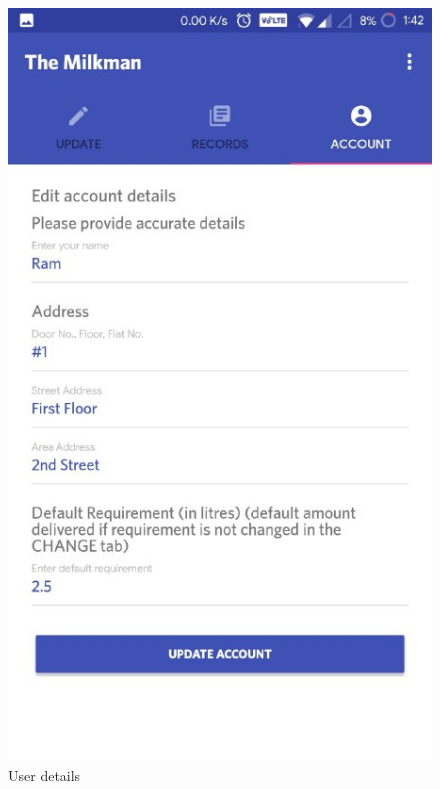\begin{figure}[h]
  \begin{center}
\includegraphics[scale=0.6]{3/seven.jpeg}
\caption{User details}
\label{fig:two}
\end{center}
\end{figure}

